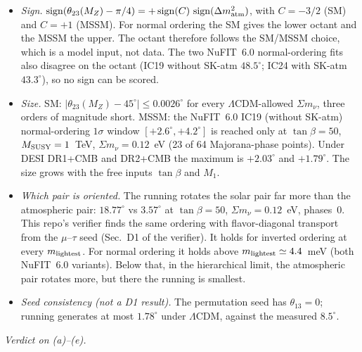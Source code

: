 \begin{itemize}
\item \emph{Sign.} $\operatorname{sign}(\theta_{23}(M_Z)-\pi/4)=+\operatorname{sign}(C)\,
  \operatorname{sign}(\Delta m^2_{\rm atm})$, with $C=-3/2$ (SM) and $C=+1$ (MSSM). For normal
  ordering the SM gives the lower octant and the MSSM the upper. The octant therefore follows the
  SM/MSSM choice, which is a model input, not data. The two NuFIT~6.0 normal-ordering fits also
  disagree on the octant (IC19 without SK-atm $48.5^\circ$; IC24 with SK-atm $43.3^\circ$), so no
  sign can be scored.
\item \emph{Size.} SM: $|\theta_{23}(M_Z)-45^\circ|\le0.0026^\circ$ for every $\Lambda$CDM-allowed
  $\Sigma m_\nu$, three orders of magnitude short. MSSM: the NuFIT~6.0 IC19 (without SK-atm)
  normal-ordering $1\sigma$ window $[+2.6^\circ,+4.2^\circ]$ is reached only at $\tan\beta=50$,
  $M_{\rm SUSY}=1$~TeV, $\Sigma m_\nu=0.12$~eV (23 of 64 Majorana-phase points). Under DESI DR1+CMB
  and DR2+CMB the maximum is $+2.03^\circ$ and $+1.79^\circ$. The size grows with the free inputs
  $\tan\beta$ and $M_1$.
\item \emph{Which pair is oriented.} The running rotates the solar pair far more than the
  atmospheric pair: $18.77^\circ$ vs $3.57^\circ$ at $\tan\beta=50$, $\Sigma m_\nu=0.12$~eV, phases~0.
  This repo's verifier finds the same ordering with flavor-diagonal transport from the
  $\mu$--$\tau$ seed (Sec.~D1 of the verifier). It holds for inverted ordering at every
  $m_{\rm lightest}$. For normal ordering it holds above $m_{\rm lightest}\simeq4.4$~meV (both
  NuFIT~6.0 variants). Below that, in the hierarchical limit, the atmospheric pair rotates more,
  but there the running is smallest.
\item \emph{Seed consistency (not a D1 result).} The permutation seed has $\theta_{13}=0$; running
  generates at most $1.78^\circ$ under $\Lambda$CDM, against the measured $8.5^\circ$.
\end{itemize}
\emph{Verdict on (a)--(e).}
